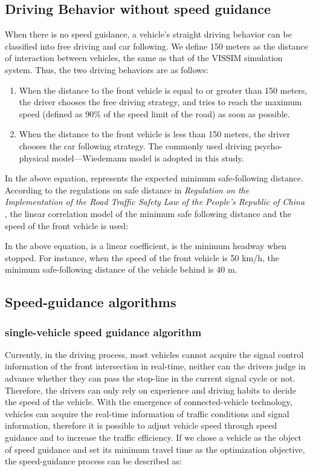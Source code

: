 \documentclass[10.5pt,compsoc]{TsT}
\theoremstyle{mystyle}
\newcommand{\upcite}[1]{\textsuperscript{\cite{#1}}}
\renewcommand{\labelenumi}{(\arabic{enumi})}
\begin{document}
{\subsection{Driving Behavior without speed guidance}

When there is no speed guidance, a vehicle's straight driving behavior
can be classified into free driving and car following. We define 150
meters as the distance of interaction between vehicles, the same as that
of the VISSIM simulation system. Thus, the two driving behaviors are as
follows:

\begin{enumerate}
\def\labelenumi{\alph{enumi})}
\item
  When the distance to the front vehicle is equal to or greater than 150
  meters, the driver chooses the free driving strategy, and tries to
  reach the maximum speed (defined as 90\% of the speed limit of the
  road) as soon as possible.
\item
  When the distance to the front vehicle is less than 150 meters, the
  driver chooses the car following strategy. The commonly used driving
  psycho-physical model---Wiedemann model \upcite{19} is
  adopted in this study.
\end{enumerate}


In the above equation, represents the expected minimum safe-following
distance. According to the regulations on safe distance in
\emph{Regulation on the Implementation of the Road Traffic Safety Law of
the People's Republic of China} \upcite{20}, the linear
correlation model of the minimum safe following distance and the speed
of the front vehicle is used:

In the above equation, is a linear coefficient, is the minimum headway
when stopped. For instance, when the speed of the front vehicle is 50
km/h, the minimum safe-following distance of the vehicle behind is 40 m.

\subsection{Speed-guidance algorithms}

\subsubsection{single-vehicle speed guidance algorithm}

Currently, in the driving process, most vehicles cannot acquire the
signal control information of the front intersection in real-time,
neither can the drivers judge in advance whether they can pass the
stop-line in the current signal cycle or not. Therefore, the drivers can
only rely on experience and driving habits to decide the speed of the
vehicle. With the emergence of connected-vehicle technology, vehicles
can acquire the real-time information of traffic conditions and signal
information, therefore it is possible to adjust vehicle speed through
speed guidance and to increase the traffic efficiency. If we chose a
vehicle as the object of speed guidance and set its minimum travel time
as the optimization objective, the speed-guidance process can be
described as:

}
\end{document}
